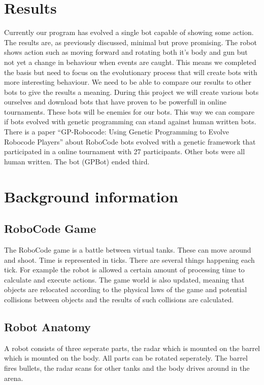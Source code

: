 \documentclass[a4paper,10pt]{article}
\begin{document}
\section{Results}
Currently our program has evolved a single bot capable of showing some action. The results are, as previously discussed, minimal but prove promising. The robot shows action such as moving forward and rotating both it's body and gun but not yet a change in behaviour when events are caught. This means we completed the basis but need to focus on the evolutionary process that will create bots with more interesting behaviour.
We need to be able to compare our results to other bots to give the results a meaning. During this project we will create various bots ourselves and download bots that have proven to be powerfull in online tournaments. These bots will be enemies for our bots. This way we can compare if bots evolved with genetic programming can stand against human written bots. There is a paper ``GP-Robocode: Using Genetic Programming to Evolve Robocode Players'' \cite{shichel} about RoboCode bots evolved with a genetic framework that participated in a online tournament with 27 participants. Other bots were all human written. The bot (GPBot) ended third.

\section{Background information}
\label{bi}
\subsection{RoboCode Game}
The RoboCode game is a battle between virtual tanks. These can move around and shoot. Time is represented in ticks. There are several things happening each tick. For example the robot is allowed a certain amount of processing time to calculate and execute actions. The game world is also updated, meaning that objects are relocated according to the physical laws of the game and potential collisions between objects and the results of such collisions are calculated.

\subsection{Robot Anatomy}
A robot consists of three seperate parts, the radar which is mounted on the barrel which is mounted on the body. All parts can be rotated seperately. The barrel fires bullets, the radar scans for other tanks and the body drives around in the arena. 
\end{document}
